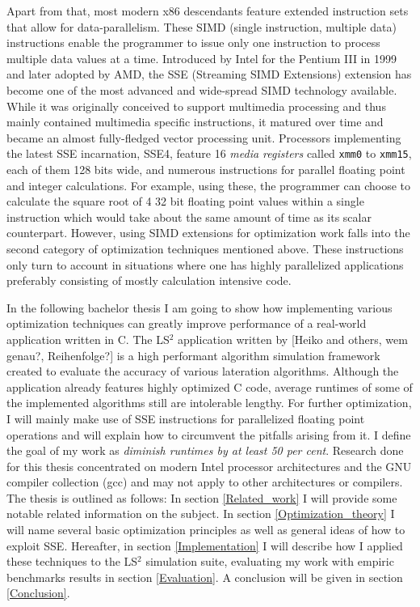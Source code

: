 Apart from that, most modern x86 descendants feature extended instruction sets that allow for data-parallelism. These SIMD (single instruction, multiple data) instructions enable the programmer to issue only one instruction to process multiple data values at a time. Introduced by Intel for the Pentium III in 1999 and later adopted by AMD, the SSE (Streaming SIMD Extensions) extension has become one of the most advanced and wide-spread SIMD technology available. While it was originally conceived to support multimedia processing and thus mainly contained multimedia specific instructions, it matured over time and became an almost fully-fledged vector processing unit. Processors implementing the latest SSE incarnation, SSE4, feature 16 \emph{media registers} called \texttt{xmm0} to \texttt{xmm15}, each of them 128 bits wide, and numerous instructions for parallel floating point and integer calculations. For example, using these, the programmer can choose to calculate the square root of 4 32 bit floating point values within a single instruction which would take about the same amount of time as its scalar counterpart. However, using SIMD extensions for optimization work falls into the second category of optimization techniques mentioned above. These instructions only turn to account in situations where one has highly parallelized applications preferably consisting of mostly calculation intensive code.

In the following bachelor thesis I am going to show how implementing various optimization techniques can greatly improve performance of a real-world application written in C. The LS$^{2}$ application written by [Heiko and others, wem genau?, Reihenfolge?] is a high performant algorithm simulation framework created to evaluate the accuracy of various lateration algorithms. Although the application already features highly optimized C code, average runtimes of some of the implemented algorithms still are intolerable lengthy. For further optimization, I will mainly make use of SSE instructions for parallelized floating point operations and will explain how to circumvent the pitfalls arising from it. I define the goal of my work as \emph{diminish runtimes by at least 50 per cent}. Research done for this thesis concentrated on modern Intel processor architectures and the GNU compiler collection (gcc) and may not apply to other architectures or compilers. The thesis is outlined as follows: In section \ref{Related_work} I will provide some notable related information on the subject. In section \ref{Optimization_theory} I will name several basic optimization principles as well as general ideas of how to exploit SSE. Hereafter, in section \ref{Implementation} I will describe how I applied these techniques to the LS$^{2}$ simulation suite, evaluating my work with empiric benchmarks results in section \ref{Evaluation}. A conclusion will be given in section \ref{Conclusion}.
